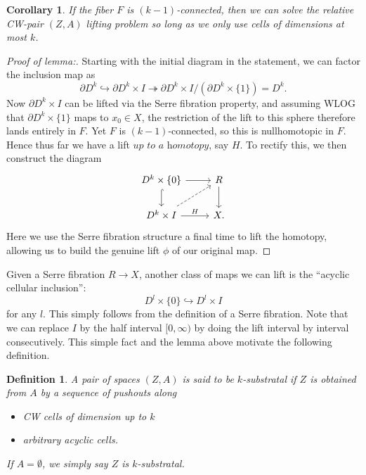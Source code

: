 \documentclass{article}
\newtheorem{corollary}[theorem]{Corollary}
\newtheorem{definition}[theorem]{Definition}
\newtheorem{proposed work}[theorem]{Proposed Work}
\theoremstyle{definition}
\begin{document}
\begin{corollary}
\label{lifting_cor}
If the fiber $F$ is $(k-1)$-connected, then we can solve the relative CW-pair $(Z,A)$ lifting problem so long as we only use cells of dimensions at most $k$.
\end{corollary}

\begin{proof}[Proof of lemma:]
Starting with the initial diagram in the statement, we can factor the inclusion map as
\begin{equation*}
\partial D^k \hookrightarrow \partial D^k \times I \twoheadrightarrow \partial D^k \times I/(\partial D^k \times \{1\}) = D^k.
\end{equation*}
Now $\partial D^k \times I$ can be lifted via the Serre fibration property, and assuming WLOG that $\partial D^k \times \{1\}$ maps to $x_0 \in X$, the restriction of the lift to this sphere therefore lands entirely in $F$. Yet $F$ is $(k-1)$-connected, so this is nullhomotopic in $F$. Hence thus far we have a lift $\textit{up to a homotopy}$, say $H$. To rectify this, we then construct the diagram
\[
\begin{tikzcd}
D^k \times \{0\} \arrow[r] \arrow[hookrightarrow]{d}
& R \arrow[d]
\\
D^k \times I \arrow[r,"H"] \arrow[dashed,ur]
& X.
\end{tikzcd}
\]
Here we use the Serre fibration structure a final time to lift the homotopy, allowing us to build the genuine lift $\phi$ of our original map.
\end{proof}


Given a Serre fibration $R \to X$, another class of maps we can lift is the ``acyclic cellular inclusion'':
\begin{equation*}
D^l\times\{0\} \hookrightarrow D^l\times I
\end{equation*}
for any $l$. This simply follows from the definition of a Serre fibration. Note that we can replace $I$ by the half interval $[0,\infty)$ by doing the lift interval by interval consecutively. This simple fact and the lemma above motivate the following definition.

\begin{definition}
A pair of spaces $(Z,A)$ is said to be $k$-substratal if $Z$ is obtained from $A$ by a sequence of pushouts along
\begin{itemize}
\item CW cells of dimension up to $k$
\item arbitrary acyclic cells.
\end{itemize}
If $A=\emptyset$, we simply say $Z$ is $k$-substratal.
\end{definition}
\end{document}
